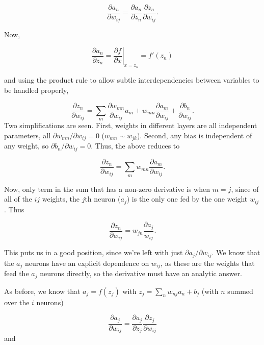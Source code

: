 \documentclass[12pt]{article}
\begin{document}
\begin{equation}
\frac{\partial a_n}{\partial w_{ij}} = \frac{\partial a_n}{\partial z_n} \frac{\partial{z_n}}{\partial w_{ij}}.
\label{d_an_wij}
\end{equation}

\noindent Now, 

\begin{equation}
\frac{\partial{ a_n}}{\partial z_n}=\left . \frac{\partial f}{\partial x} \right\vert_{x=z_n}=f'(z_n)
\end{equation}

\noindent and using the product rule to allow subtle interdependencies between variables to be handled properly, 

\begin{equation}
\frac{\partial{z_n}}{\partial w_{ij}}=\sum_m \frac{\partial w_{mn}}{\partial w_{ij}} a_m + w_{mn}\frac{\partial a_m}{\partial w_{ij}} + \frac{\partial b_n}{\partial w_{ij}}.
\end{equation}
Two simplifications are seen. First, weights in different layers are all independent parameters, all $\partial w_{mn}/\partial w_{ij}=0$ ($w_{mn}\sim w_{jk}$).  Second, any bias is independent of any weight, so $\partial b_n/\partial w_{ij}=0$. Thus, the above reduces to

\begin{equation}
\frac{\partial{z_n}}{\partial w_{ij}}=\sum_m w_{mn}\frac{\partial a_m}{\partial w_{ij}}.
\end{equation}

\noindent Now, only term in the sum that has a non-zero derivative is when $m=j$, since of all of the $ij$ weights, the $j$th neuron ($a_j$) is the only one fed by the one weight $w_{ij}$.  Thus


\begin{equation}
\frac{\partial{z_n}}{\partial w_{ij}}=w_{jn}\frac{\partial a_j}{w_{ij}}.
\label{zn_by_wij}
\end{equation}

This puts us in a good position, since we're left with just $\partial a_j/\partial w_{ij}$.  We know that the $a_j$ neurons have an explicit dependence on $w_{ij}$, as these are the weights that feed the $a_j$ neurons directly, so the derivative must have an analytic answer.

As before, we know that $a_j=f(z_j)$ with $z_j=\sum_n w_{nj}a_n+b_j$ (with $n$ summed over the $i$ neurons)

\begin{equation}
\frac{\partial{a_j}}{\partial w_{ij}}=\frac{\partial{a_j}}{\partial z_j} \frac{\partial z_j}{\partial w_{ij}}
\label{aj_by_wij}
\end{equation}
and
\end{document}
